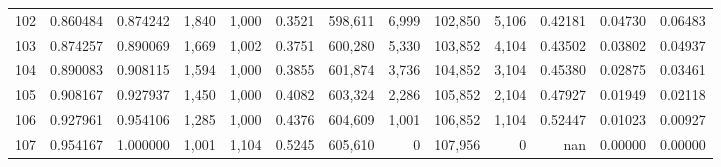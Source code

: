 \begin{tabular}{rrrrrrrrrrrrr}
102 &  0.860484 &  0.874242 &   1,840 &  1,000 &                                     0.3521 &  598,611 &    6,999 &  102,850 &    5,106 &  0.42181 &  0.04730 &  0.06483 \\
103 &  0.874257 &  0.890069 &   1,669 &  1,002 &                                     0.3751 &  600,280 &    5,330 &  103,852 &    4,104 &  0.43502 &  0.03802 &  0.04937 \\
104 &  0.890083 &  0.908115 &   1,594 &  1,000 &                                     0.3855 &  601,874 &    3,736 &  104,852 &    3,104 &  0.45380 &  0.02875 &  0.03461 \\
105 &  0.908167 &  0.927937 &   1,450 &  1,000 &                                     0.4082 &  603,324 &    2,286 &  105,852 &    2,104 &  0.47927 &  0.01949 &  0.02118 \\
106 &  0.927961 &  0.954106 &   1,285 &  1,000 &                                     0.4376 &  604,609 &    1,001 &  106,852 &    1,104 &  0.52447 &  0.01023 &  0.00927 \\
107 &  0.954167 &  1.000000 &   1,001 &  1,104 &                                     0.5245 &  605,610 &        0 &  107,956 &        0 &      nan &  0.00000 &  0.00000 \\
\bottomrule
\end{tabular}
